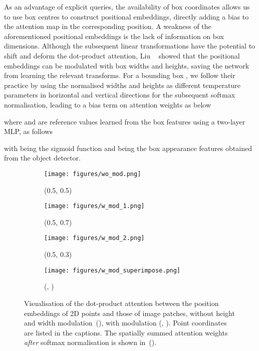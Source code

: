 \documentclass[10pt,twocolumn,letterpaper]{article}
\begin{document}
As an advantage of explicit queries, the availability of box coordinates allows us to use box centres to construct positional embeddings, directly adding a bias to the attention map in the corresponding position. A weakness of the aforementioned positional embeddings is the lack of information on box dimensions. Although the subsequent linear transformations have the potential to shift and deform the dot-product attention, Liu \etal~\cite{dab-detr} showed that the positional embeddings can be modulated with box widths and heights, saving the network from learning the relevant transforms. For a bounding box , we follow their practice by using the normalised widths and heights as different temperature parameters in horizontal and vertical directions for the subsequent softmax normalisation, leading to a bias term on attention weights as below

where  and  are reference values learned from the box features using a two-layer MLP, as follows

with  being the sigmoid function and  being the box appearance features obtained from the object detector.

\begin{figure}[t]
   \begin{subfigure}[t]{.24\linewidth}
      \centering
      \texttt{[image: figures/wo\_mod.png]}
      \caption{(0.5, 0.5)}
      \label{fig:mod_attn_1}
   \end{subfigure}
   \hfill
   \begin{subfigure}[t]{.24\linewidth}
      \centering
      \texttt{[image: figures/w\_mod\_1.png]}
      \caption{(0.5, 0.7)}
      \label{fig:mod_attn_2}
   \end{subfigure}
   \hfill
   \begin{subfigure}[t]{.24\linewidth}
      \centering
      \texttt{[image: figures/w\_mod\_2.png]}
      \caption{(0.5, 0.3)}
      \label{fig:mod_attn_3}
   \end{subfigure}
   \hfill
   \begin{subfigure}[t]{.24\linewidth}
      \centering
      \texttt{[image: figures/w\_mod\_superimpose.png]}
      \caption{(, )}
      \label{fig:mod_attn_4}
   \end{subfigure}
   \vspace{5px}
   \caption{Visualisation of the dot-product attention between the position embeddings of 2D points and those of image patches, without height and width modulation~(), with modulation (, ). Point coordinates are listed in the captions. The spatially summed attention weights \textit{after} softmax normalisation is shown in~().}
   \label{fig:mod_attn}
\end{figure}
\end{document}

